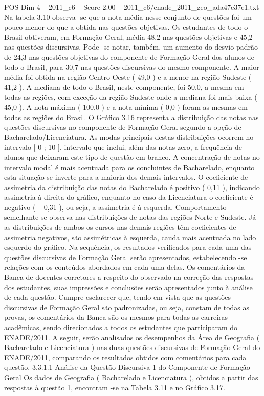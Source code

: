\begin{textsample}{POS Dim 4 – 2011\_c6 – Score 2.00 – 2011\_c6/enade\_2011\_geo\_ada47c37e1.txt}
Na tabela 3.10 observa -se que a nota média nesse conjunto de questões foi um pouco menor do que a obtida nas questões objetivas.
Os estudantes de todo o Brasil obtiveram, em Formação Geral, média 48,2 nas questões objetivas e 45,2 nas questões discursivas.
Pode -se notar, também, um aumento do desvio padrão de 24,3 nas questões objetivas do componente de Formação Geral dos alunos de todo o Brasil, para 30,7 nas questões discursivas do mesmo componente.
A maior média foi obtida na região Centro-Oeste ( 49,0 ) e a menor na região Sudeste ( 41,2 ).
A mediana de todo o Brasil, neste componente, foi 50,0, a mesma em todas as regiões, com exceção da região Sudeste onde a mediana foi mais baixa ( 45,0 ).
A nota máxima ( 100,0 ) e a nota mínima ( 0,0 ) foram as mesmas em todas as regiões do Brasil.
O Gráfico 3.16 representa a distribuição das notas nas questões discursivas no componente de Formação Geral segundo a opção de Bacharelado/Licenciatura.
As modas principais destas distribuições ocorrem no intervalo [ 0 ; 10 ], intervalo que inclui, além das notas zero, a frequência de alunos que deixaram este tipo de questão em branco.
A concentração de notas no intervalo modal é mais acentuada para os concluintes de Bacharelado, enquanto esta situação se inverte para a maioria dos demais intervalos.
O coeficiente de assimetria da distribuição das notas do Bacharelado é positivo ( 0,11 ), indicando assimetria à direita do gráfico, enquanto no caso da Licenciatura o coeficiente é negativo ( – 0,31 ), ou seja, a assimetria é à esquerda.
Comportamento semelhante se observa nas distribuições de notas das regiões Norte e Sudeste.
Já as distribuições de ambos os cursos nas demais regiões têm coeficientes de assimetria negativos, são assimétricas à esquerda, cauda mais acentuada no lado esquerdo do gráfico.
Na sequência, os resultados verificados para cada uma das questões discursivas de Formação Geral serão apresentados, estabelecendo -se relações com os conteúdos abordados em cada uma delas.
Os comentários da Banca de docentes corretores a respeito do observado na correção das respostas dos estudantes, suas impressões e conclusões serão apresentados junto à análise de cada questão.
Cumpre esclarecer que, tendo em vista que as questões discursivas de Formação Geral são padronizadas, ou seja, constam de todas as provas, os comentários da Banca são os mesmos para todas as carreiras acadêmicas, sendo direcionados a todos os estudantes que participaram do ENADE/2011.
A seguir, serão analisados os desempenhos da Área de Geografia ( Bacharelado e Licenciatura ) nas duas questões discursivas de Formação Geral do ENADE/2011, comparando os resultados obtidos com comentários para cada questão. 3.3.1.1 Análise da Questão Discursiva 1 do Componente de Formação Geral Os dados de Geografia ( Bacharelado e Licenciatura ), obtidos a partir das respostas à questão 1, encontram -se na Tabela 3.11 e no Gráfico 3.17.

\end{textsample}
